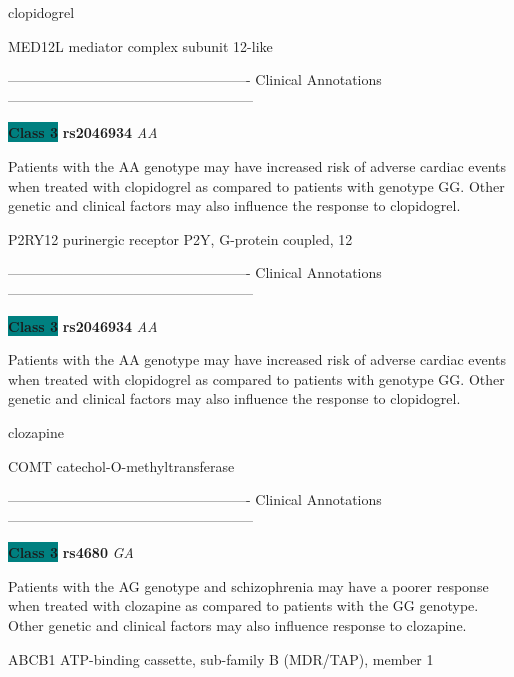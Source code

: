 \documentclass{resume} %
\begin{document}
\begin{rSection}{ clopidogrel }
\begin{rSubsection}{ MED12L }{ mediator complex subunit 12-like }{}{}
\item[] ---------------------------------------------------- Clinical Annotations -----------------------------------------------------\newline
\item \textbf{\colorbox{teal} {Class 3}} \textbf{ rs2046934 } \textit{ AA }
\item[] Patients with the AA genotype may have increased risk of adverse cardiac events when treated with clopidogrel as compared to patients with genotype GG. Other genetic and clinical factors may also influence the response to clopidogrel.
\end{rSubsection}\begin{rSubsection}{ P2RY12 }{ purinergic receptor P2Y, G-protein coupled, 12 }{}{}
\item[]

\item[] ---------------------------------------------------- Clinical Annotations -----------------------------------------------------\newline
\item \textbf{\colorbox{teal} {Class 3}} \textbf{ rs2046934 } \textit{ AA }
\item[] Patients with the AA genotype may have increased risk of adverse cardiac events when treated with clopidogrel as compared to patients with genotype GG. Other genetic and clinical factors may also influence the response to clopidogrel.
\end{rSubsection}

\end{rSection}\begin{rSection}{ clozapine }
\item[]

\begin{rSubsection}{ COMT }{ catechol-O-methyltransferase }{}{}
\item[]

\item[] ---------------------------------------------------- Clinical Annotations -----------------------------------------------------\newline
\item \textbf{\colorbox{teal} {Class 3}} \textbf{ rs4680 } \textit{ GA }
\item[] Patients with the AG genotype and schizophrenia may have a poorer response when treated with clozapine as compared to patients with the GG genotype. Other genetic and clinical factors may also influence response to clozapine.
\end{rSubsection}\begin{rSubsection}{ ABCB1 }{ ATP-binding cassette, sub-family B (MDR/TAP), member 1 }{}{}
\item[]


\end{rSubsection}
\end{rSection}
\end{document}
